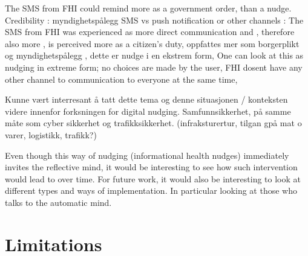 The SMS from FHI could remind more as a government order, than a nudge. 
Credibility : myndighetspålegg 
SMS vs push notification or other channels : The SMS from FHI was experienced as more direct communication and , therefore also more , is perceived more as a citizen's duty, oppfattes mer som borgerplikt og myndighetspålegg , dette er nudge i en ekstrem form, 
One can look at this as nudging in extreme form; no choices are made by the user,
FHI dosent have any other channel to communication to everyone at the same time, 

Kunne vært interresant å tatt dette tema og denne situasjonen / konteksten videre innenfor forksningen for digital nudging. Samfunnsikkerhet, på samme måte som cyber sikkerhet og trafikksikkerhet. (infraksturertur, tilgan gpå mat o varer, logistikk, trafikk?)

Even though this way of nudging (informational health nudges) immediately invites the reflective mind, it would be interesting to see how such intervention would lead to over time.  For future work, it would also be interesting to look at different types and ways of implementation. In particular looking at those who talks to the automatic mind. 

\section{Limitations}
